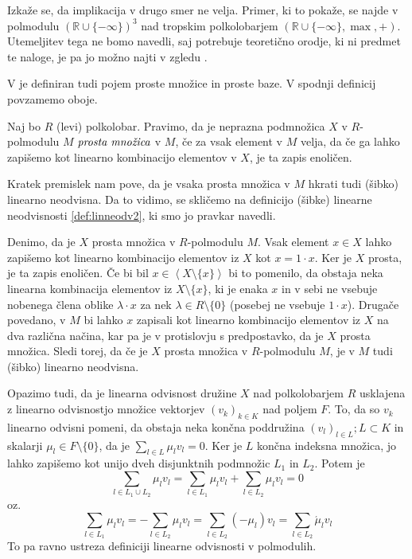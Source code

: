 \documentclass[mat1]{fmfdelo}
\newcommand{\R}{\mathbb{R}}
\newcommand{\pojem}[1]{\ensuremath{\emph{#1}}}
\newcommand{\Gen}[1]{\ensuremath{\left<{#1}\right>}}
\begin{document}
Izkaže se, da implikacija v drugo smer ne velja. Primer, ki to pokaže, se najde v polmodulu $(\R\cup\{-\infty\})^3$ nad tropskim polkolobarjem $(\R\cup\{-\infty\}, \max, +)$. Utemeljitev tega ne bomo navedli, saj potrebuje teoretično orodje, ki ni predmet te naloge, je pa jo možno najti v zgledu \cite[zgled 2. 14.]{bib:AkianTropSemi}.

V \cite[definicija 2.\,3.\,]{bib:Tanbase} je definiran tudi pojem proste množice in proste baze. V spodnji definicij povzamemo oboje.
\begin{definicija}
Naj bo $R$ (levi) polkolobar. Pravimo, da je neprazna podmnožica $X$ v $R$-polmodulu $M$ \pojem{prosta množica} v $M$, če za vsak element v $M$ velja, da če ga lahko zapišemo kot linearno kombinacijo elementov v $X$, je ta zapis enoličen. 
\end{definicija}

Kratek premislek nam pove, da je vsaka prosta množica v $M$ hkrati tudi (šibko) linearno neodvisna. Da to vidimo, se skličemo na definicijo (šibke) linearne neodvisnosti \ref{def:linneodv2}, ki smo jo pravkar navedli.

Denimo, da je $X$ prosta množica v $R$-polmodulu $M$. Vsak element $x\in X$ lahko zapišemo kot linearno kombinacijo elementov iz $X$ kot $x = 1\cdot x$. Ker je $X$ prosta, je ta zapis enoličen. Če bi bil $x \in\Gen{X\setminus\{x\}}$ bi to pomenilo, da obstaja neka linearna kombinacija elementov iz $X\setminus\{x\}$, ki je enaka $x$ in v sebi ne vsebuje nobenega člena oblike $\lambda\cdot x$ za nek $\lambda\in R\setminus\{0\}$ (posebej ne vsebuje $1\cdot x$). Drugače povedano, v $M$ bi lahko $x$ zapisali kot linearno kombinacijo elementov iz $X$ na dva različna načina, kar pa je v protislovju s predpostavko, da je $X$ prosta množica. Sledi torej, da če je $X$ prosta množica v $R$-polmodulu $M$, je v $M$ tudi (šibko) linearno neodvisna.

Opazimo tudi, da je linearna odvisnost družine $X$ nad polkolobarjem $R$ usklajena z linearno odvisnostjo množice vektorjev $(v_k)_{k\in K}$ nad poljem $F$.
To, da so $v_k$ linearno odvisni pomeni, da obstaja neka končna poddružina $(v_l)_{l\in L}; L\subset K$ in skalarji $\mu_l\in F\setminus\{0\}$, da je $\sum_{l\in L}\mu_lv_l = 0$. Ker je $L$ končna indeksna množica, jo lahko zapišemo kot unijo dveh disjunktnih podmnožic $L_1$ in $L_2$. Potem je $$ \sum_{l\in L_1\cup L_2} \mu_lv_l = \sum_{l\in L_1}\mu_lv_l + \sum_{l\in L_2}\mu_lv_l = 0$$ oz. $$\sum_{l\in L_1}\mu_lv_l = - \sum_{l\in L_2}\mu_lv_l = \sum_{l\in L_2} (-\mu_l)v_l = \sum_{l\in L_2}\acute{\mu}_lv_l $$
To pa ravno ustreza definiciji linearne odvisnosti v polmodulih. 
\end{document}
